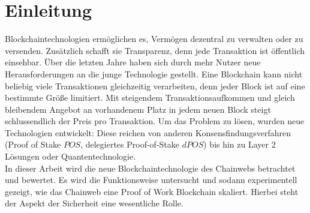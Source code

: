 \section{Einleitung}
Blockchaintechnologien ermöglichen es, Vermögen dezentral zu verwalten oder zu versenden. Zusätzlich schafft sie Transparenz, denn jede Transaktion ist öffentlich einsehbar. Über die letzten Jahre haben sich durch mehr Nutzer neue Herausforderungen an die junge Technologie gestellt. Eine Blockchain kann nicht beliebig viele Transaktionen gleichzeitig verarbeiten, denn jeder Block ist auf eine bestimmte Größe limitiert. Mit steigendem Transaktionsaufkommen und gleich bleibendem Angebot an vorhandenem Platz in jedem neuen Block steigt schlussendlich der Preis pro Transaktion. Um das Problem zu lösen, wurden neue Technologien entwickelt: Diese reichen von anderen Konsensfindungsverfahren (Proof of Stake $POS$, delegiertes  Proof-of-Stake $dPOS$) bis hin zu Layer 2 Lösungen oder Quantentechnologie. \cite{BundesamtfurSicherheitinderInformationstechnik.2019}
\\
In dieser Arbeit wird die neue Blockchaintechnologie des Chainwebs betrachtet und bewertet. Es wird die Funktionsweise untersucht und sodann experimentell gezeigt, wie das Chainweb eine Proof of Work Blockchain skaliert. Hierbei steht der Aspekt der Sicherheit eine wesentliche Rolle.